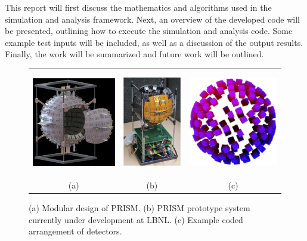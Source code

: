 \documentclass[10pt]{article}
\begin{document}
This report will first discuss the mathematics and algorithms used in the simulation and analysis framework. Next, an overview of the developed code will be presented, outlining how to execute the simulation and analysis code. Some example test inputs will be included, as well as a discussion of the output results. Finally, the work will be summarized and future work will be outlined. 


\begin{figure}[htb]
\hypertarget{fig1}{}
\centering
\begin{tabular}{ccc}
	\includegraphics[height=130pt]{Figures/PRISM_Design.png} & 
	\includegraphics[height=130pt]{Figures/PRISM_Prototype.png} & 
	\includegraphics[height=130pt]{Figures/Masked_Configuration.png} \\
	\scriptsize{(a)} & \scriptsize{(b)} & \scriptsize{(c)} \\[-6pt]
\end{tabular}
\caption{(a) Modular design of PRISM. (b) PRISM prototype system currently under development at LBNL. (c) Example coded arrangement of detectors.}
\end{figure}
\end{document}
